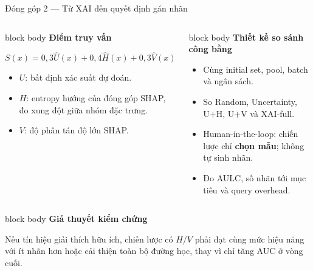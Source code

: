 \documentclass[aspectratio=169,10pt]{beamer}
\newcommand{\smallbullet}{\setlength{\itemsep}{0.15em}\setlength{\parskip}{0pt}}
\newenvironment{bluebox}[1]{%
  \begin{beamercolorbox}[rounded=true,shadow=true,sep=0.18cm]{block body}%
  {\color{uetblue}\textbf{#1}}\par\vspace{0.08cm}\color{ink}%
}{\end{beamercolorbox}}
\begin{document}
\begin{frame}[t,shrink=7]{Đóng góp 2 — Từ XAI đến quyết định gán nhãn}
\begin{columns}[T,onlytextwidth]
\begin{bluebox}{Điểm truy vấn}
\[
S(x)=0{,}3\widehat U(x)+0{,}4\widehat H(x)+0{,}3\widehat V(x)
\]
\small
\begin{itemize}\smallbullet
  \item $U$: bất định xác suất dự đoán.
  \item $H$: entropy hướng của đóng góp SHAP, đo xung đột giữa nhóm đặc trưng.
  \item $V$: độ phân tán độ lớn SHAP.
\end{itemize}
\end{bluebox}

\begin{bluebox}{Thiết kế so sánh công bằng}
\small
\begin{itemize}\smallbullet
  \item Cùng initial set, pool, batch và ngân sách.
  \item So Random, Uncertainty, U+H, U+V và XAI-full.
  \item Human-in-the-loop: chiến lược chỉ \textbf{chọn mẫu}; không tự sinh nhãn.
  \item Đo AULC, số nhãn tới mục tiêu và query overhead.
\end{itemize}
\end{bluebox}
\end{columns}

\vspace{0.20cm}
\begin{bluebox}{Giả thuyết kiểm chứng}
Nếu tín hiệu giải thích hữu ích, chiến lược có $H/V$ phải đạt cùng mức hiệu năng với ít nhãn hơn hoặc cải thiện toàn bộ đường học, thay vì chỉ tăng AUC ở vòng cuối.
\end{bluebox}
\end{frame}
\end{document}

